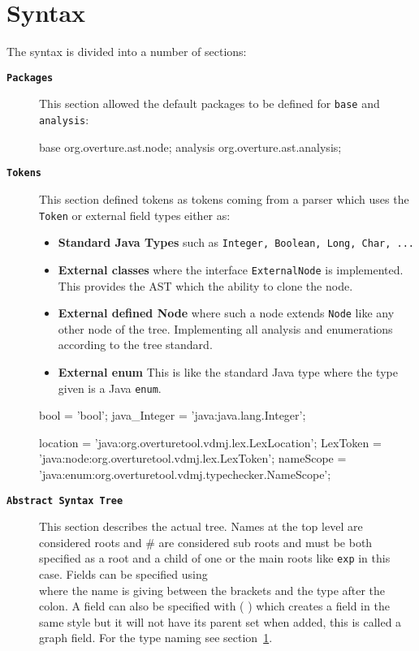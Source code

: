 {}



\section{Syntax}

The syntax is divided into a number of sections:

\begin{description}

\item[\textbf{\texttt{Packages}}] This section allowed the default packages to be defined for \texttt{base} and \texttt{analysis}:

\begin{astlst}
base org.overture.ast.node;
analysis org.overture.ast.analysis;
\end{astlst}

\item[\textbf{\texttt{Tokens}}] This section defined tokens as tokens coming from a parser which uses the \texttt{Token} or external field types either as:
\begin{itemize}
\item \textbf{Standard Java Types} such as \texttt{Integer, Boolean, Long, Char, ...}
\item \textbf{External classes} where the interface \texttt{ExternalNode} is implemented. This provides the AST which the ability to clone the node.
\item \textbf{External defined Node} where such a node extends \texttt{Node} like any other node of the tree. Implementing all analysis and enumerations according to the tree standard.
\item \textbf{External enum} This is like the standard Java type where the type given is a Java \texttt{enum}.
\end{itemize}

\begin{astlst}
bool = 'bool';
java_Integer = 'java:java.lang.Integer';

location = 'java:org.overturetool.vdmj.lex.LexLocation';
LexToken = 'java:node:org.overturetool.vdmj.lex.LexToken';
nameScope = 'java:enum:org.overturetool.vdmj.typechecker.NameScope';
\end{astlst}

\item[\textbf{\texttt{Abstract Syntax Tree}}] This section describes the actual tree. Names at the top level are considered roots and \# are considered sub roots and must be both specified as a root and a child of one or the main roots like \texttt{exp} in this case. Fields can be specified using \[ \] where the name is giving between the brackets and the type after the colon. A field can also be specified with ( ) which creates a field in the same style but it will not have its parent set when added, this is called a graph field. For the type naming see section~\ref{}.



\end{description}
